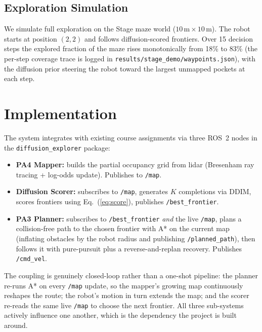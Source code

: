 \documentclass[conference]{IEEEtran}
\begin{document}
\subsection{Exploration Simulation}
We simulate full exploration on the Stage maze world
($10\,\text{m} \times 10\,\text{m}$). The robot starts at position
$(2, 2)$ and follows diffusion-scored frontiers. Over 15 decision
steps the explored fraction of the maze rises monotonically from
18\% to 83\% (the per-step coverage trace is logged in
\texttt{results/stage\_demo/waypoints.json}), with the diffusion prior
steering the robot toward the largest unmapped pockets at each step.

\section{Implementation}

The system integrates with existing course assignments via three ROS~2
nodes in the \texttt{diffusion\_explorer} package:

\begin{itemize}
  \item \textbf{PA4 Mapper:} builds the partial occupancy grid from
    lidar (Bresenham ray tracing + log-odds update). Publishes to
    \texttt{/map}.
  \item \textbf{Diffusion Scorer:} subscribes to \texttt{/map},
    generates $K$ completions via DDIM, scores frontiers using
    Eq.~(\ref{eq:score}), publishes \texttt{/best\_frontier}.
  \item \textbf{PA3 Planner:} subscribes to \texttt{/best\_frontier}
    \emph{and} the live \texttt{/map}, plans a collision-free path to
    the chosen frontier with A* on the current map (inflating obstacles
    by the robot radius and publishing \texttt{/planned\_path}), then
    follows it with pure-pursuit plus a reverse-and-replan recovery.
    Publishes \texttt{/cmd\_vel}.
\end{itemize}

The coupling is genuinely closed-loop rather than a one-shot pipeline:
the planner re-runs A* on every \texttt{/map} update, so the mapper's
growing map continuously reshapes the route; the robot's motion in turn
extends the map; and the scorer re-reads the same live \texttt{/map} to
choose the next frontier. All three sub-systems actively influence one
another, which is the dependency the project is built around.
\end{document}
